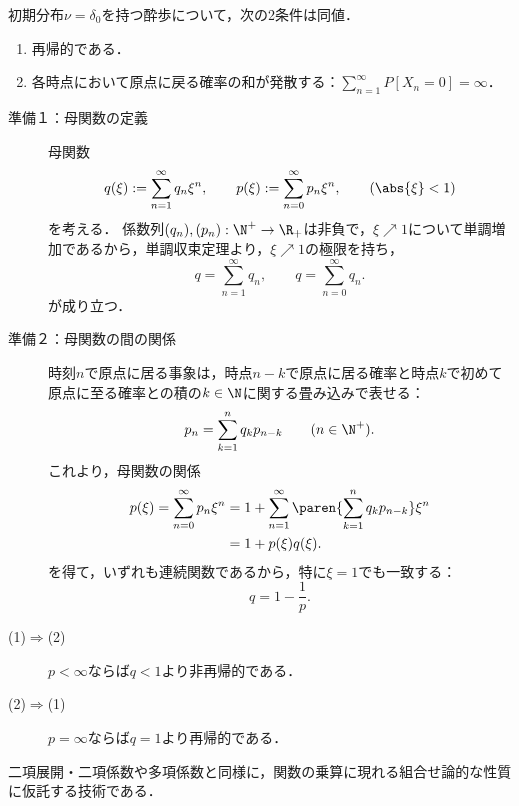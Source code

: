 \documentclass[uplatex,dvipdfmx]{jsreport}
\begin{document}
\begin{theorem}[再帰性の特徴付け]
    初期分布$\nu=\delta_0$を持つ酔歩について，次の2条件は同値．
    \begin{enumerate}
        \item 再帰的である．
        \item 各時点において原点に戻る確率の和が発散する：$\sum^\infty_{n=1}P[X_n=0]=\infty$．
    \end{enumerate}
\end{theorem}
\begin{Proof}\mbox{}
    \begin{description}
        \item[準備１：母関数の定義]  母関数
        \[q(\xi):=\sum_{n=1}^\infty q_n\xi^n,\qquad p(\xi):=\sum_{n=0}^\infty p_n\xi^n,\qquad(\abs{\xi}<1)\]
        を考える．
        係数列$(q_n),(p_n):\N^+\to\R_+$は非負で，$\xi\nearrow1$について単調増加であるから，単調収束定理より，$\xi\nearrow1$の極限を持ち，
        \[q=\sum_{n=1}^\infty q_n,\qquad q=\sum_{n=0}^\infty q_n.\]
        が成り立つ．
        \item[準備２：母関数の間の関係] 時刻$n$で原点に居る事象は，時点$n-k$で原点に居る確率と時点$k$で初めて原点に至る確率との積の$k\in\N$に関する畳み込みで表せる：
        \[p_n=\sum_{k=1}^nq_kp_{n-k}\qquad(n\in\N^+).\]
        これより，母関数の関係
        \begin{align*}
            p(\xi)=\sum_{n=0}^\infty p_n\xi^n&=1+\sum_{n=1}^\infty\paren{\sum_{k=1}^nq_kp_{n-k}}\xi^n\\
            &=1+p(\xi)q(\xi).
        \end{align*}
        を得て，いずれも連続関数であるから，特に$\xi=1$でも一致する：
        \[q=1-\frac{1}{p}.\]
    \end{description}
    \begin{description}
        \item[(1)$\Rightarrow$(2)] $p<\infty$ならば$q<1$より非再帰的である．
        \item[(2)$\Rightarrow$(1)] $p=\infty$ならば$q=1$より再帰的である．
    \end{description}
\end{Proof}
\begin{remarks}[母関数について]
    二項展開・二項係数や多項係数と同様に，関数の乗算に現れる組合せ論的な性質に仮託する技術である．

\end{remarks}
\end{document}
